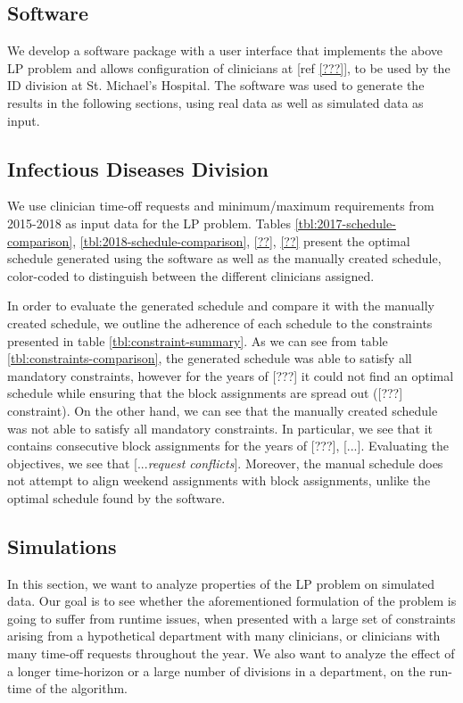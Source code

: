 \subsection{Software}
We develop a software package with a user interface that implements the above LP problem and allows configuration of clinicians at [ref \ref{???}], to be used by the ID division at St. Michael's Hospital. The software was used to generate the results in the following sections, using real data as well as simulated data as input.

\subsection{Infectious Diseases Division}
We use clinician time-off requests and minimum/maximum requirements from 2015-2018 as input data for the LP problem. Tables \ref{tbl:2017-schedule-comparison}, \ref{tbl:2018-schedule-comparison}, \ref{??}, \ref{??} present the optimal schedule generated using the software as well as the manually created schedule, color-coded to distinguish between the different clinicians assigned.




In order to evaluate the generated schedule and compare it with the manually created schedule, we outline the adherence of each schedule to the constraints presented in table \ref{tbl:constraint-summary}. As we can see from table \ref{tbl:constraints-comparison}, the generated schedule was able to satisfy all mandatory constraints, however for the years of [???] it could not find an optimal schedule while ensuring that the block assignments are spread out ([???] constraint). On the other hand, we can see that the manually created schedule was not able to satisfy all mandatory constraints. In particular, we see that it contains consecutive block assignments for the years of [???], [...]. Evaluating the objectives, we see that [...\textit{request conflicts}]. Moreover, the manual schedule does not attempt to align weekend assignments with block assignments, unlike the optimal schedule found by the software.



\subsection{Simulations}
In this section, we want to analyze properties of the LP problem on simulated data. Our goal is to see whether the aforementioned formulation of the problem is going to suffer from runtime issues, when presented with a large set of constraints arising from a hypothetical department with many clinicians, or clinicians with many time-off requests throughout the year. We also want to analyze the effect of a longer time-horizon or a large number of divisions in a department, on the run-time of the algorithm. \\

